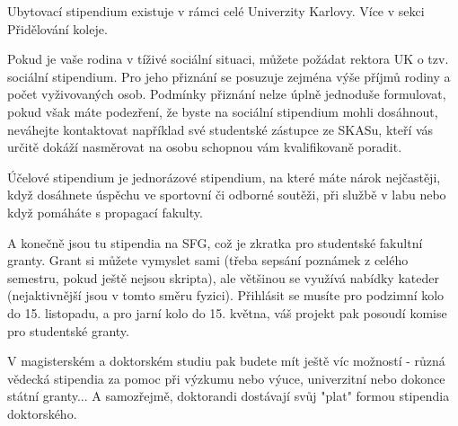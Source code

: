 Ubytovací stipendium existuje v rámci celé Univerzity Karlovy. Více v sekci Přidělování koleje.

Pokud je vaše rodina v tíživé sociální situaci, můžete požádat rektora UK o tzv. sociální stipendium. Pro jeho přiznání se posuzuje zejména výše příjmů rodiny a počet vyživovaných osob. Podmínky přiznání nelze úplně jednoduše formulovat, pokud však máte podezření, že byste na sociální stipendium mohli dosáhnout, neváhejte kontaktovat například své studentské zástupce ze SKASu, kteří vás určitě dokáží nasměrovat na osobu schopnou vám kvalifikovaně poradit.

Účelové stipendium je jednorázové stipendium, na které máte nárok nejčastěji, když dosáhnete úspěchu ve sportovní či odborné soutěži, při službě v labu nebo když pomáháte s propagací fakulty.

A konečně jsou tu stipendia na SFG, což je zkratka pro studentské fakultní granty. Grant si můžete vymyslet sami (třeba sepsání poznámek z celého semestru, pokud ještě nejsou skripta), ale většinou se využívá nabídky kateder (nejaktivnější jsou v tomto směru fyzici). Přihlásit se musíte pro podzimní kolo do 15. listopadu, a pro jarní kolo do 15. května, váš projekt pak posoudí komise pro studentské granty.

V magisterském a doktorském studiu pak budete mít ještě víc možností - různá vědecká stipendia za pomoc při výzkumu nebo výuce, univerzitní nebo dokonce státní granty... A samozřejmě, doktorandi dostávají svůj "plat" formou stipendia doktorského.



